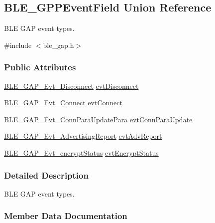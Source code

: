 \hypertarget{union_b_l_e___g_p_p_event_field}{}\subsection{B\+L\+E\+\_\+\+G\+P\+P\+Event\+Field Union Reference}
\label{union_b_l_e___g_p_p_event_field}


B\+LE G\+AP event types.  




{\ttfamily \#include $<$ble\+\_\+gap.\+h$>$}

\subsubsection*{Public Attributes}
\begin{DoxyCompactItemize}
\item 
\hyperlink{struct_b_l_e___g_a_p___evt___disconnect}{B\+L\+E\+\_\+\+G\+A\+P\+\_\+\+Evt\+\_\+\+Disconnect} \hyperlink{union_b_l_e___g_p_p_event_field_a2482d32836d54574f3592c8ccca0ab82}{evt\+Disconnect}
\item 
\hyperlink{struct_b_l_e___g_a_p___evt___connect}{B\+L\+E\+\_\+\+G\+A\+P\+\_\+\+Evt\+\_\+\+Connect} \hyperlink{union_b_l_e___g_p_p_event_field_a6a3d5648b6f5b393e7c11ee02ad53e42}{evt\+Connect}
\item 
\hyperlink{struct_b_l_e___g_a_p___evt___conn_para_update_para}{B\+L\+E\+\_\+\+G\+A\+P\+\_\+\+Evt\+\_\+\+Conn\+Para\+Update\+Para} \hyperlink{union_b_l_e___g_p_p_event_field_a8397ac75fd3d09b1da8c748a4c008dff}{evt\+Conn\+Para\+Update}
\item 
\hyperlink{struct_b_l_e___g_a_p___evt___advertising_report}{B\+L\+E\+\_\+\+G\+A\+P\+\_\+\+Evt\+\_\+\+Advertising\+Report} \hyperlink{union_b_l_e___g_p_p_event_field_abb9d92705e60200d39d0d00eb21e6b43}{evt\+Adv\+Report}
\item 
\hyperlink{struct_b_l_e___g_a_p___evt__encrypt_status}{B\+L\+E\+\_\+\+G\+A\+P\+\_\+\+Evt\+\_\+encrypt\+Status} \hyperlink{union_b_l_e___g_p_p_event_field_a918fa93a046585d38b701dd69b4755a3}{evt\+Encrypt\+Status}
\end{DoxyCompactItemize}


\subsubsection{Detailed Description}
B\+LE G\+AP event types. 

\subsubsection{Member Data Documentation}

